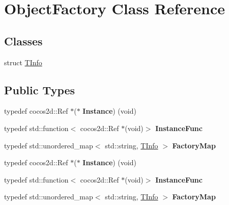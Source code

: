 \hypertarget{classObjectFactory}{}\section{Object\+Factory Class Reference}
\label{classObjectFactory}
\subsection*{Classes}
\begin{DoxyCompactItemize}
\item 
struct \hyperlink{structObjectFactory_1_1TInfo}{T\+Info}
\end{DoxyCompactItemize}
\subsection*{Public Types}
\begin{DoxyCompactItemize}
\item 
\mbox{\label{classObjectFactory_a91092401a3b5bf3b4ad317c56f0214fe}} 
typedef cocos2d\+::\+Ref $\ast$($\ast$ {\bfseries Instance}) (void)
\item 
\mbox{\label{classObjectFactory_aa711d67d919dc0536089832a9d6e6e52}} 
typedef std\+::function$<$ cocos2d\+::\+Ref $\ast$(void)$>$ {\bfseries Instance\+Func}
\item 
\mbox{\label{classObjectFactory_ad45256dddcd85b951289f43cf0fb2157}} 
typedef std\+::unordered\+\_\+map$<$ std\+::string, \hyperlink{structObjectFactory_1_1TInfo}{T\+Info} $>$ {\bfseries Factory\+Map}
\item 
\mbox{\label{classObjectFactory_a91092401a3b5bf3b4ad317c56f0214fe}} 
typedef cocos2d\+::\+Ref $\ast$($\ast$ {\bfseries Instance}) (void)
\item 
\mbox{\label{classObjectFactory_aa711d67d919dc0536089832a9d6e6e52}} 
typedef std\+::function$<$ cocos2d\+::\+Ref $\ast$(void)$>$ {\bfseries Instance\+Func}
\item 
\mbox{\label{classObjectFactory_ad45256dddcd85b951289f43cf0fb2157}} 
typedef std\+::unordered\+\_\+map$<$ std\+::string, \hyperlink{structObjectFactory_1_1TInfo}{T\+Info} $>$ {\bfseries Factory\+Map}
\end{DoxyCompactItemize}
